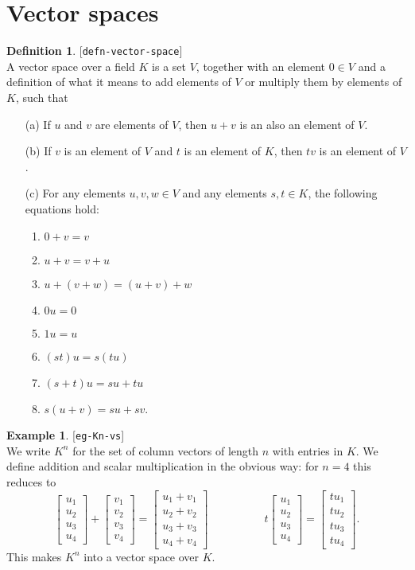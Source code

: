 \documentclass{amsart}
\newcommand{\lbl}[1]{\label{#1}\textup{[\texttt{#1}]}\ \\}
\newcommand{\lbl}{\label}
\newcommand{\bsm}       {\left[\begin{smallmatrix}}
\newcommand{\esm}       {\end{smallmatrix}\right]}
\renewcommand{\:}{\colon}
\theoremstyle{definition}
\newtheorem{definition}[theorem]{Definition}
\newtheorem{example}[theorem]{Example}
\begin{document}
\section{Vector spaces}
\label{sec-vector-spaces}

\begin{definition}\lbl{defn-vector-space}
 A vector space over a field $K$ is a set $V$, together with
 an element $0\in V$ and a definition of what it means to
 add elements of $V$ or multiply them by elements of $K$,
 such that
 \begin{itemize}
  \item[(a)] If $u$ and $v$ are elements of $V$, then $u+v$ is an
   also an element of $V$.
  \item[(b)] If $v$ is an element of $V$ and $t$ is an
   element of $K$, then $tv$ is an element of $V$.
  \item[(c)] For any elements $u,v,w\in V$ and any elements
   $s,t\in K$, the following equations hold:
    \begin{enumerate}
     \item $0+v=v$
     \item $u+v=v+u$
     \item $u+(v+w)=(u+v)+w$
     \item $0u=0$
     \item $1u=u$
     \item $(st)u=s(tu)$
     \item $(s+t)u=su+tu$
     \item $s(u+v)=su+sv$.
    \end{enumerate}
 \end{itemize}  
\end{definition}

\begin{example}\lbl{eg-Kn-vs}
 We write $K^n$ for the set of column vectors of length $n$ with
 entries in $K$.  We define addition and scalar multiplication in the
 obvious way: for $n=4$ this reduces to 
 \[ \bsm u_1\\ u_2\\ u_3\\ u_4\esm + 
    \bsm v_1\\ v_2\\ v_3\\ v_4\esm =
    \bsm u_1+v_1\\ u_2+v_2\\ u_3+v_3\\ u_4+v_4\esm
    \hspace{5em}
    t \bsm u_1\\ u_2\\ u_3\\ u_4\esm =
    \bsm tu_1\\ tu_2\\ tu_3\\ tu_4\esm.
 \]
 This makes $K^n$ into a vector space over $K$.
\end{example}
\end{document}
